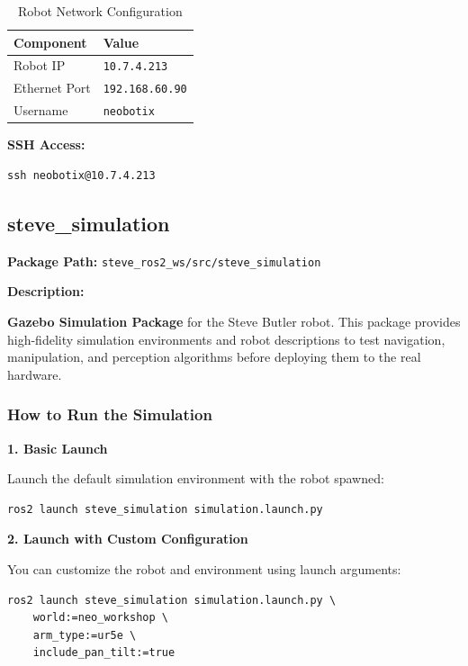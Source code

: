 \documentclass[12pt,oneside,a4paper]{article}
\begin{document}
\begin{table}[h]
\centering
\begin{tabular}{|l|l|}
\hline
\textbf{Component} & \textbf{Value} \\ \hline
Robot IP & \texttt{10.7.4.213} \\ \hline
Ethernet Port & \texttt{192.168.60.90} \\ \hline
Username & \texttt{neobotix} \\ \hline
\end{tabular}
\caption{Robot Network Configuration}
\label{tab:network_config}
\end{table}

\textbf{SSH Access:}
\begin{lstlisting}[style=bashstyle]
ssh neobotix@10.7.4.213
\end{lstlisting}

\subsection{steve\_simulation}
\label{subsec:steve_simulation}

\textbf{Package Path:} \texttt{steve\_ros2\_ws/src/steve\_simulation}

\textbf{Description:}

\textbf{Gazebo Simulation Package} for the Steve Butler robot. This package provides high-fidelity simulation environments and robot descriptions to test navigation, manipulation, and perception algorithms before deploying them to the real hardware.

\subsubsection{How to Run the Simulation}

\textbf{1. Basic Launch}

Launch the default simulation environment with the robot spawned:
\begin{lstlisting}[style=bashstyle]
ros2 launch steve_simulation simulation.launch.py
\end{lstlisting}

\textbf{2. Launch with Custom Configuration}

You can customize the robot and environment using launch arguments:
\begin{lstlisting}[style=bashstyle]
ros2 launch steve_simulation simulation.launch.py \
    world:=neo_workshop \
    arm_type:=ur5e \
    include_pan_tilt:=true
\end{lstlisting}
\end{document}
